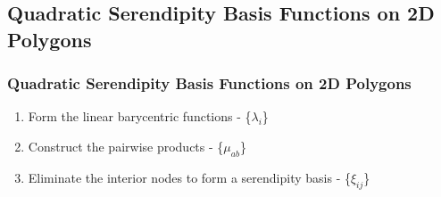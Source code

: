 \documentclass[compress,10pt]{beamer}
\begin{document}
\subsection{Quadratic Serendipity Basis Functions on 2D Polygons}
\typeout{***********************************************************************************}
\begin{frame}[t]\frametitle{Quadratic Serendipity Basis Functions on 2D Polygons}
\begin{block}{}
\begin{enumerate}
	\item <1-> Form the linear barycentric functions - \{$\lambda_i$\}
	\item <2-> Construct the pairwise products -  \{$\mu_{ab}$\}
	\item <3-> Eliminate the interior nodes to form a serendipity basis - \{$\xi_{ij}$\}
\end{enumerate}
\end{block}
\vspace{1cm}
\begin{columns}[c]
\centering
{}
\centering
{}
\end{columns}
\end{frame}
\end{document}
